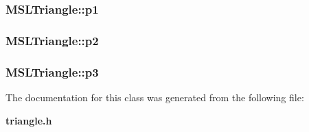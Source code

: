 \subsubsection{ MSLTriangle::p1}\label{class_MSLTriangle_m0}


\subsubsection{ MSLTriangle::p2}\label{class_MSLTriangle_m1}


\subsubsection{ MSLTriangle::p3}\label{class_MSLTriangle_m2}




The documentation for this class was generated from the following file:\begin{CompactItemize}
\item 
{\bf triangle.h}\end{CompactItemize}
